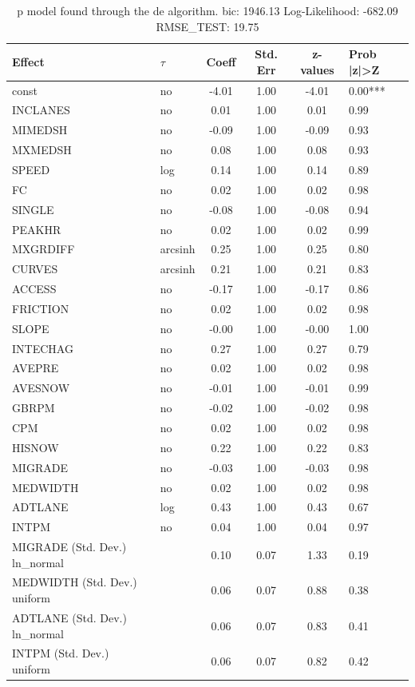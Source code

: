 \begin{table}
	\caption{p model found through the de algorithm. bic: 1946.13 Log-Likelihood: -682.09 RMSE_TEST: 19.75}
	\begin{center}
		\begin{tabular}{|l|l|c|c|c|l|}
			\hline
			Effect & $\tau$ & Coeff & Std. Err & z-values & Prob |z|>Z \\
			\hline
			const & no & -4.01 & 1.00 & -4.01 & 0.00*** \\
			\hline
			INCLANES & no & 0.01 & 1.00 & 0.01 & 0.99 \\
			\hline
			MIMEDSH & no & -0.09 & 1.00 & -0.09 & 0.93 \\
			\hline
			MXMEDSH & no & 0.08 & 1.00 & 0.08 & 0.93 \\
			\hline
			SPEED & log & 0.14 & 1.00 & 0.14 & 0.89 \\
			\hline
			FC & no & 0.02 & 1.00 & 0.02 & 0.98 \\
			\hline
			SINGLE & no & -0.08 & 1.00 & -0.08 & 0.94 \\
			\hline
			PEAKHR & no & 0.02 & 1.00 & 0.02 & 0.99 \\
			\hline
			MXGRDIFF & arcsinh & 0.25 & 1.00 & 0.25 & 0.80 \\
			\hline
			CURVES & arcsinh & 0.21 & 1.00 & 0.21 & 0.83 \\
			\hline
			ACCESS & no & -0.17 & 1.00 & -0.17 & 0.86 \\
			\hline
			FRICTION & no & 0.02 & 1.00 & 0.02 & 0.98 \\
			\hline
			SLOPE & no & -0.00 & 1.00 & -0.00 & 1.00 \\
			\hline
			INTECHAG & no & 0.27 & 1.00 & 0.27 & 0.79 \\
			\hline
			AVEPRE & no & 0.02 & 1.00 & 0.02 & 0.98 \\
			\hline
			AVESNOW & no & -0.01 & 1.00 & -0.01 & 0.99 \\
			\hline
			GBRPM & no & -0.02 & 1.00 & -0.02 & 0.98 \\
			\hline
			CPM & no & 0.02 & 1.00 & 0.02 & 0.98 \\
			\hline
			HISNOW & no & 0.22 & 1.00 & 0.22 & 0.83 \\
			\hline
			MIGRADE & no & -0.03 & 1.00 & -0.03 & 0.98 \\
			\hline
			MEDWIDTH & no & 0.02 & 1.00 & 0.02 & 0.98 \\
			\hline
			ADTLANE & log & 0.43 & 1.00 & 0.43 & 0.67 \\
			\hline
			INTPM & no & 0.04 & 1.00 & 0.04 & 0.97 \\
			\hline
			MIGRADE (Std. Dev.) ln_normal &  & 0.10 & 0.07 & 1.33 & 0.19 \\
			\hline
			MEDWIDTH (Std. Dev.) uniform &  & 0.06 & 0.07 & 0.88 & 0.38 \\
			\hline
			ADTLANE (Std. Dev.) ln_normal &  & 0.06 & 0.07 & 0.83 & 0.41 \\
			\hline
			INTPM (Std. Dev.) uniform &  & 0.06 & 0.07 & 0.82 & 0.42 \\
			\hline
		\end{tabular}
	\end{center}
\end{table}